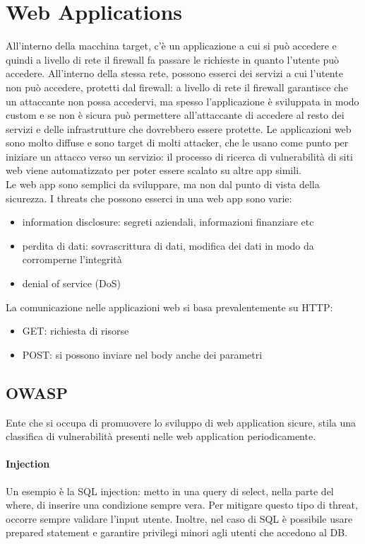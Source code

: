 \documentclass{article}
\begin{document}
\section{Web Applications}
All'interno della macchina target, c'è un applicazione a cui si può accedere e quindi a livello di rete il firewall fa passare le richieste in quanto l'utente può accedere. All'interno della stessa rete, possono esserci dei servizi a cui l'utente non può accedere, protetti dal firewall: a livello di rete il firewall garantisce che un attaccante non possa accedervi, ma spesso l'applicazione è sviluppata in modo custom e se non è sicura può permettere all'attaccante di accedere al resto dei servizi e delle infrastrutture che dovrebbero essere protette. Le applicazioni web sono molto diffuse e sono target di molti attacker, che le usano come punto per iniziare un attacco verso un servizio: il processo di ricerca di vulnerabilità di siti web viene automatizzato per poter essere scalato su altre app simili.\\ Le web app sono semplici da sviluppare, ma non dal punto di vista della sicurezza. I threats che possono esserci in una web app sono varie:
\begin{itemize}
\item information disclosure: segreti aziendali, informazioni finanziare etc
\item perdita di dati: sovrascrittura di dati, modifica dei dati in modo da corromperne l'integrità
\item denial of service (DoS)
\end{itemize}
La comunicazione nelle applicazioni web si basa prevalentemente su HTTP:
\begin{itemize}
\item GET: richiesta di risorse
\item POST: si possono inviare nel body anche dei parametri
\end{itemize}
\subsection{OWASP}Ente che si occupa di promuovere lo sviluppo di web application sicure, stila una classifica di vulnerabilità presenti nelle web application periodicamente.
\paragraph{Injection}Un esempio è la SQL injection: metto in una query di select, nella parte del where, di inserire una condizione sempre vera. Per mitigare questo tipo di threat, occorre sempre validare l'input utente. Inoltre, nel caso di SQL è possibile usare prepared statement e garantire privilegi minori agli utenti che accedono al DB.
\end{document}
